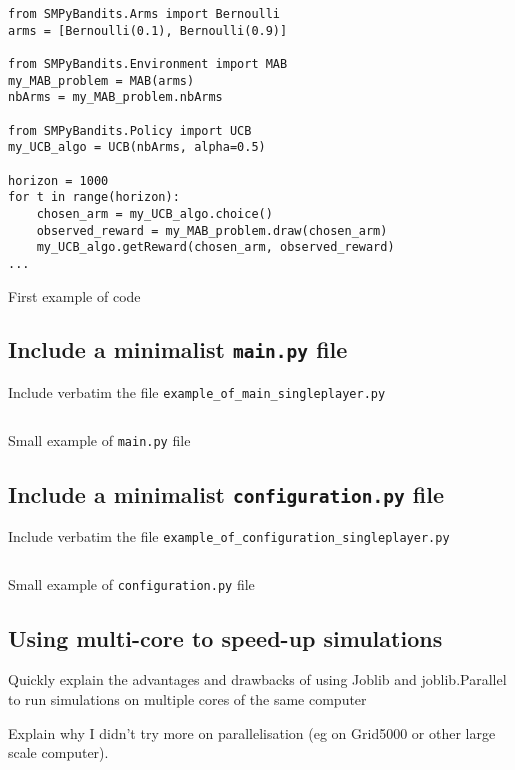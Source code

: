 \begin{listing}[H]
\begin{verbatim}
from SMPyBandits.Arms import Bernoulli
arms = [Bernoulli(0.1), Bernoulli(0.9)]

from SMPyBandits.Environment import MAB
my_MAB_problem = MAB(arms)
nbArms = my_MAB_problem.nbArms

from SMPyBandits.Policy import UCB
my_UCB_algo = UCB(nbArms, alpha=0.5)

horizon = 1000
for t in range(horizon):
    chosen_arm = my_UCB_algo.choice()
    observed_reward = my_MAB_problem.draw(chosen_arm)
    my_UCB_algo.getReward(chosen_arm, observed_reward)
...
\end{verbatim}
\caption{First example of code}
\label{lst:3:example}
\end{listing}

\subsection{Include a minimalist \texttt{main.py} file}

Include verbatim the file
\texttt{example\_of\_main\_singleplayer.py}

\begin{listing}[H]
% 
\inputminted[linenos=true,numbersep=5pt,frame=lines,framesep=2mm]{Python}{2-Chapters/3-Chapter/src/example_of_main_singleplayer.py}
\caption{Small example of \texttt{main.py} file}
\label{lst:3:main}
\end{listing}

\subsection{Include a minimalist \texttt{configuration.py} file}

Include verbatim the file
\texttt{example\_of\_configuration\_singleplayer.py}

\begin{listing}[H]
% 
\inputminted[linenos=true,numbersep=5pt,frame=lines,framesep=2mm]{Python}{2-Chapters/3-Chapter/src/example_of_configuration_singleplayer.py}
\caption{Small example of \texttt{configuration.py} file}
\label{lst:3:configuration}
\end{listing}


\subsection{Using multi-core to speed-up simulations}

Quickly explain the advantages and drawbacks of using Joblib and joblib.Parallel to run simulations on multiple cores of the same computer

Explain why I didn't try more on parallelisation (eg on Grid5000 or other large scale computer).
